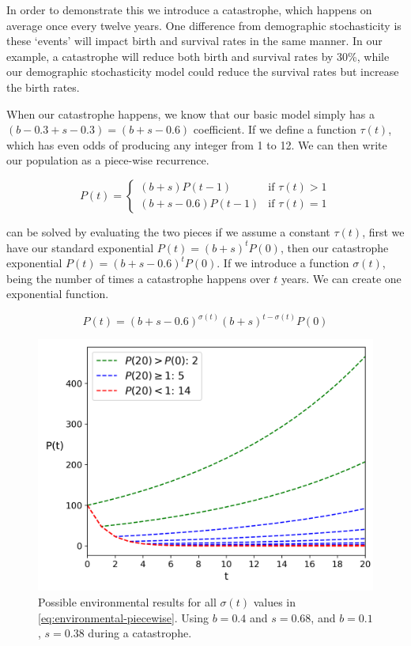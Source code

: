 \documentclass{article}
\begin{document}
In order to demonstrate this we introduce a catastrophe, which happens on average once every twelve years. One difference from demographic stochasticity is these `events' will impact birth and survival rates in the same manner. In our example, a catastrophe will reduce both birth and survival rates by 30\%, while our demographic stochasticity model could reduce the survival rates but increase the birth rates.

When our catastrophe happens, we know that our basic model simply has a \\$(b-0.3 + s-0.3)=(b+s - 0.6)$ coefficient. If we define a function $\tau(t)$, which has even odds of producing any integer from 1 to 12. We can then write our population as a piece-wise recurrence.

\begin{equation} \label{eq:environmental-piecewise}
    P(t)=\begin{cases}
        (b+s)P(t-1) & \text{if } \tau(t) > 1 \\
        (b+s-0.6)P(t-1) & \text{if } \tau(t) = 1
    \end{cases}
\end{equation}

 can be solved by evaluating the two pieces if we assume a constant $\tau(t)$, first we have our standard exponential $P(t)=(b+s)^tP(0)$, then our catastrophe exponential $P(t)=(b+s-0.6)^tP(0)$. If we introduce a function $\sigma(t)$, being the number of times a catastrophe happens over $t$ years. We can create one exponential function.

\begin{equation} \label{eq:environmental-exponential}
    P(t) = (b+s-0.6)^{\sigma(t)}(b+s)^{t-\sigma(t)}P(0)
\end{equation}

\begin{figure}[h!]
    \centering
    \includegraphics[width=.5\linewidth]{plots/environmental_classes.png}
    \caption{Possible environmental results for all $\sigma(t)$ values in \cref{eq:environmental-piecewise}. Using $b = 0.4$ and $s = 0.68$, and $b = 0.1$, $s = 0.38$ during a catastrophe.}
    \label{fig:environmental-classes}
\end{figure}
\end{document}
